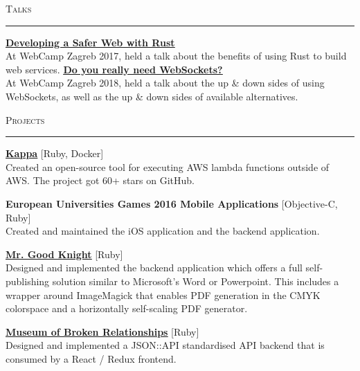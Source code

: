 \documentclass[10pt, a4paper, final, onecolumn, oneside, notitlepage]{article}
\newcommand{\sectionspacing}[0]{ \vspace{10pt} } %
\newcommand{\sectionrule}[0]{ \rule[6pt]{\textwidth}{0.5pt} } %
\renewcommand{\section}[1]{\sectionspacing {\large \scshape #1} \sectionrule}
\begin{document}
\begin{center}
  \section{Talks}
  \begin{flushleft}
    \textbf{\href{https://2017.webcampzg.org/talks/developing-a-safer-web-with-rust/}{\underline{Developing a Safer Web with Rust}}}\\
    At WebCamp Zagreb 2017, held a talk about the benefits of using Rust to build web services.
    \vspace{2mm}
    \textbf{\href{https://2018.webcampzg.org/talks/do-you-really-need-websockets/}{\underline{Do you really need WebSockets?}}}\\
    At WebCamp Zagreb 2018, held a talk about the up \& down sides of using WebSockets, as well as the up \& down sides of available alternatives.
    \vspace{2mm}
  \end{flushleft}

  \section{Projects}
  \begin{flushleft}
    \textbf {\href{https://github.com/monorkin/kappa}{\underline{Kappa}}} [Ruby, Docker]\\
    Created an open-source tool for executing AWS lambda functions outside of AWS. The project got 60+ stars on GitHub.
    \vspace{40mm}

    \textbf{European Universities Games 2016 Mobile Applications} [Objective-C, Ruby]\\
    Created and maintained the iOS application and the backend application. \\
    \vspace{2mm}

    \textbf{\href{https://www.mrgoodknight.de/}{\underline{Mr. Good Knight}}} [Ruby]\\
    Designed and implemented the backend application which offers a full
    self-publishing solution similar to Microsoft's Word or Powerpoint.
    This includes a wrapper around ImageMagick that enables PDF generation in the
    CMYK colorspace and a horizontally self-scaling PDF generator. \\
    \vspace{2mm}

    \textbf{\href{https://brokenships.com}{\underline{Museum of Broken Relationships}}} [Ruby]\\
    Designed and implemented a JSON::API standardised API backend that is
    consumed by a React / Redux frontend. \\
    \vspace{2mm}


\end{flushleft}
\end{center}
\end{document}
